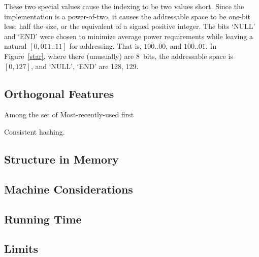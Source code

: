 \documentclass[12pt]{article}
\begin{document}
These two special values cause the indexing to be two values short. Since the implementation is a power-of-two, it causes the addressable space to be one-bit less; half the size, or the equivalent of a signed positive integer. The bits `NULL' and `END' were chosen to minimize average power requirements while leaving a natural $[0, 011..11]$ for addressing. That is, $100..00$, and $100..01$. In Figure~\ref{star}, where there (unusually) are 8~bits, the addressable space is $[0, 127]$, and `NULL', `END' are 128, 129.

\subsection{Orthogonal Features}

Among the set of  Most-recently-used first

Consistent hashing.

\subsection{Structure in Memory}

\subsection{Machine Considerations}

\subsection{Running Time}

\subsection{Limits}


\end{document}
